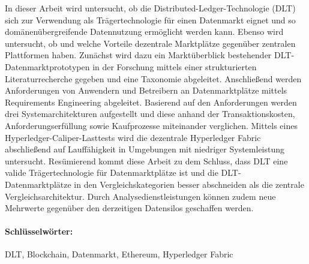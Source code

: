 In dieser Arbeit wird untersucht, ob die Distributed-Ledger-Technologie (DLT) sich zur Verwendung als Trägertechnologie für einen Datenmarkt eignet und so domänenübergreifende Datennutzung ermöglicht werden kann.  Ebenso wird untersucht, ob und welche Vorteile dezentrale Marktplätze gegenüber zentralen Plattformen haben.  Zunächst wird dazu ein Marktüberblick bestehender DLT-Datenmarktprototypen in der Forschung mittels einer strukturierten Literaturrecherche gegeben und eine Taxonomie abgeleitet.  Anschließend werden Anforderungen von Anwendern und Betreibern an Datenmarktplätze mittels Requirements Engineering abgeleitet. Basierend auf den Anforderungen werden drei Systemarchitekturen aufgestellt und diese anhand der Transaktionskosten,  Anforderungserfüllung sowie Kaufprozesse miteinander verglichen.  Mittels eines Hyperledger-Caliper-Lasttests wird die dezentrale Hyperledger Fabric abschließend auf Lauffähigkeit in Umgebungen mit niedriger Systemleistung untersucht.  Resümierend kommt diese Arbeit zu dem Schluss, dass DLT eine valide Trägertechnologie für Datenmarktplätze ist und die DLT-Datenmarktplätze in den Vergleichskategorien besser abschneiden als die zentrale Vergleichsarchitektur.  Durch Analysedienstleistungen können zudem neue Mehrwerte gegenüber den derzeitigen Datensilos geschaffen werden.
\vspace{1cm}
\paragraph{Schlüsselwörter:} DLT, Blockchain, Datenmarkt, Ethereum, Hyperledger Fabric
